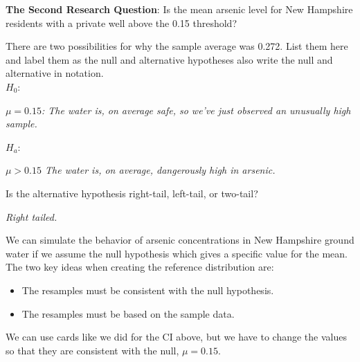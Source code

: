 {\bf The Second Research Question}: Is the mean arsenic level
for New Hampshire residents with a private well above the 0.15 threshold? 


  There are two possibilities for why the sample average
was 0.272.  List them here and label them as the null and alternative
hypotheses also write the null and alternative in notation.\\
$H_0:$ 
\begin{students}
  \vspace{1cm}
\end{students}
\begin{key}
  {\it   $ \mu = 0.15$:  The water is, on average safe, so we've just
  observed an unusually high sample.}
\end{key}

$H_a:$
\begin{students}
  \vspace{1cm}
\end{students}
\begin{key}
  {\it  $ \mu > 0.15$  The water is, on average, dangerously high in arsenic.}
\end{key}

Is the alternative hypothesis right-tail, left-tail, or two-tail?
\begin{students}
  \vspace{1cm}
\end{students}

\begin{key}
  {\it Right tailed.}
\end{key}

We can simulate the behavior of arsenic concentrations in New
Hampshire ground water if we assume the null hypothesis which gives a
specific value for the mean.  The two key ideas when creating the
reference distribution are:
\begin{itemize}
\item 
 The resamples must be consistent with the null hypothesis.
\item 
 The resamples must be based on the sample data.
\end{itemize}

  We can use cards like we did for the CI above,
but we have to change the values so that they are consistent with the
null, $\mu = 0.15$.

